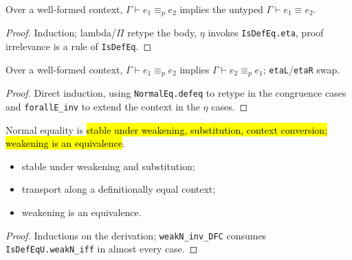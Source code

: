 \begin{lemma}
\label{thm:normaleq-defeq}
\leanok
{}

 Over a well-formed context, $\Gamma\vdash e_1\equiv_p e_2$ implies the untyped
$\Gamma\vdash e_1\equiv e_2$.
\end{lemma}
\begin{proof}
\leanok
{} Induction; lambda/$\Pi$ retype the body, $\eta$ invokes \texttt{IsDefEq.eta}, proof
irrelevance is a rule of \texttt{IsDefEq}.
\end{proof}

\begin{lemma}
\label{thm:normaleq-symm}
\leanok
{}

 Over a well-formed context, $\Gamma\vdash e_1\equiv_p e_2$ implies
$\Gamma\vdash e_2\equiv_p e_1$; \texttt{etaL}/\texttt{etaR} swap.
\end{lemma}
\begin{proof}
\leanok
{} Direct induction, using \texttt{NormalEq.defeq} to retype in the congruence cases
and \texttt{forallE\_inv} to extend the context in the $\eta$ cases.
\end{proof}

\begin{lemma}
\label{fam:normaleq-struct}
\leanok
{}

 Normal equality is \hl{stable under weakening, substitution, context
conversion; weakening is an equivalence}.
\begin{itemize}
\item stable under weakening and substitution;
\item transport along a definitionally equal context;
\item weakening is an equivalence.
\end{itemize}
\end{lemma}
\begin{proof}
\leanok
{} Inductions on the derivation; \texttt{weakN\_inv\_DFC} consumes \stSorry{}
\texttt{IsDefEqU.weakN\_iff} in almost every case.
\end{proof}

